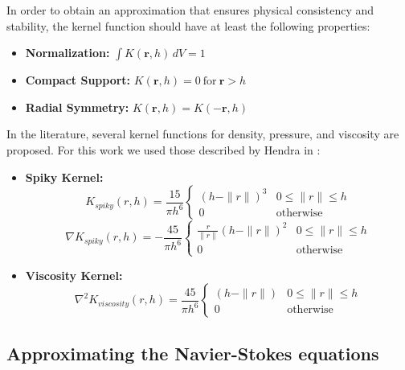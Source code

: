 \noindent
In order to obtain an approximation that ensures physical consistency and stability, the kernel function should have at least the following properties:
\begin{itemize}
    \item \textbf{Normalization:}  
          $\int{K(\mathbf{r}, h) \, dV} = 1$ \ 
    \item \textbf{Compact Support:}  
          $ K(\mathbf{r}, h) = 0\ \text{for}\ \mathbf{r} > h $ \ 
    \item \textbf{Radial Symmetry:}  
          $ K(\mathbf{r}, h) = K(-\mathbf{r}, h) $ \ 
\end{itemize}

\noindent
In the literature, several kernel functions for density, pressure, and viscosity are proposed. For this work we used those described by Hendra in \cite{hendra2015kernels}:

\begin{itemize}
    \item \textbf{Spiky Kernel:}
    $$
        K_{spiky}(r, h) = \frac{15}{\pi h^6}
            \begin{cases}
                (h - \|r\|)^3 & 0\leq\|r\|\leq h\\
                0 & \text{otherwise} \label{eq:spiky}
            \end{cases}
    $$
    $$
        \nabla K_{spiky}(r, h) = -\frac{45}{\pi h^6}
        \begin{cases}
            \frac{r}{\|r\|}(h - \|r\|)^2 & 0\leq\|r\|\leq h\\
            0 & \text{otherwise} \label{eq:spikyGrad}
        \end{cases}
    $$
    \item \textbf{Viscosity Kernel:}
    $$
        \nabla^2 K_{viscosity}(r, h) = \frac{45}{\pi h^6}
            \begin{cases}
               (h - \|r\|) & 0\leq\|r\|\leq h\\
                0 & \text{otherwise} \label{eq:viscLaplacian}
            \end{cases}
    $$
\end{itemize}



\subsection{Approximating the Navier-Stokes equations}

